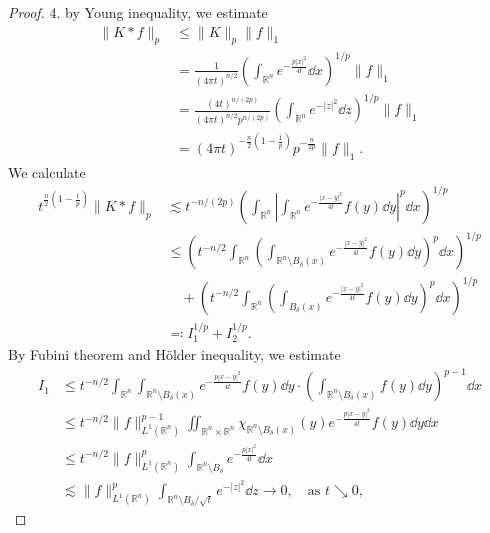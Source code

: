 \begin{proof}
	4. by Young inequality, we estimate
	\begin{align*}
		\|K*f\|_p &\leq \|K\|_p\|f\|_1\\
		&= \frac{1}{(4\pi t)^{n/2}}\left(\int_{\mathbb R^n}e^{-\frac{p|x|^2}{4t}}\dd x\right)^{1/p}\|f\|_1\\
		&= \frac{(4t)^{n/(2p)}}{(4\pi t)^{n/2}p^{n/(2p)}}\left(\int_{\mathbb R^n}e^{-|z|^2}\dd z\right)^{1/p}\|f\|_1\\
		&= (4\pi t)^{-\frac{n}2\left(1-\frac1p\right)}p^{-\frac{n}{2p}}\|f\|_1.
	\end{align*}
	We calculate
	\begin{align*}
		t^{\frac{n}{2}\left(1-\frac1p\right)}\|K*f\|_p 
		&\lesssim t^{-n/(2p)}\left(\int_{\mathbb R^n}\left|\int_{\mathbb R^n}e^{-\frac{|x-y|^2}{4t}}f(y)\dd y\right|^p\dd x\right)^{1/p}\\
		&\leq \left(t^{-n/2}\int_{\mathbb R^n}\left(\int_{\mathbb R^n\setminus B_\delta(x)}e^{-\frac{|x-y|^2}{4t}}f(y)\dd y\right)^p\dd x\right)^{1/p}\\
		&\quad + \left(t^{-n/2}\int_{\mathbb R^n}\left(\int_{B_\delta(x)}e^{-\frac{|x-y|^2}{4t}}f(y)\dd y\right)^p\dd x\right)^{1/p}\\
		&\eqcolon I_1^{1/p} + I_2^{1/p}.
	\end{align*}
	By Fubini theorem and H\"older inequality, we estimate
	\begin{align*}
		I_1
		&\leq t^{-n/2} \int_{\mathbb R^n}\int_{\mathbb R^n\setminus B_\delta(x)}e^{-\frac{p|x-y|^2}{4t}}f(y)\dd y
		\cdot \left(\int_{\mathbb R^n\setminus B_\delta(x)}f(y)\dd y\right)^{p-1}\dd x\\
		&\leq t^{-n/2}\|f\|^{p-1}_{L^1(\mathbb R^n)}\iint_{\mathbb R^n\times\mathbb R^n}
		\chi_{\mathbb R^n\setminus B_\delta(x)}(y)	e^{-\frac{p|x-y|^2}{4t}}f(y)\dd y\dd x\\
		&\leq t^{-n/2}\|f\|_{L^1(\mathbb R^n)}^{p}\int_{\mathbb R^n\setminus B_\delta}e^{-\frac{p|x|^2}{4t}}\dd x\\
		&\lesssim \|f\|_{L^1(\mathbb R^n)}^{p}\int_{\mathbb R^n\setminus B_\delta/\sqrt t}e^{-|z|^2}\dd z
		\to 0,\quad\text{as }t\searrow0,
	\end{align*}

\end{proof}
